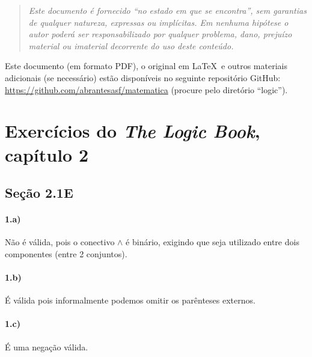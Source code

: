 \documentclass[pdftex,a4paper,12pt,brazil]{article} %
\begin{document}
\begin{quote}
  \emph{Este documento é fornecido ``no estado em que se encontra'', sem garantias de qualquer
    natureza, expressas ou implícitas. Em nenhuma hipótese o autor poderá ser responsabilizado
    por qualquer problema, dano, prejuízo material ou imaterial decorrente do uso deste
    conteúdo.}
\end{quote}

Este documento (em formato PDF), o original em \LaTeX\ e outros materiais
adicionais (se necessário) estão disponíveis no seguinte
repositório GitHub: \url{https://github.com/abrantesasf/matematica} (procure pelo
diretório ``logic'').


\section{Exercícios do \emph{The Logic Book}, capítulo 2}
\label{tlb-2}


\subsection{Seção 2.1E}
\label{tlb-2-21e}

\paragraph{1.a)} Não é válida, pois o conectivo $\wedge$ é binário, exigindo que seja
utilizado entre dois componentes (entre 2 conjuntos).

\paragraph{1.b)} É válida pois informalmente podemos omitir os parênteses externos.

\paragraph{1.c)} É uma negação válida.
\end{document}
